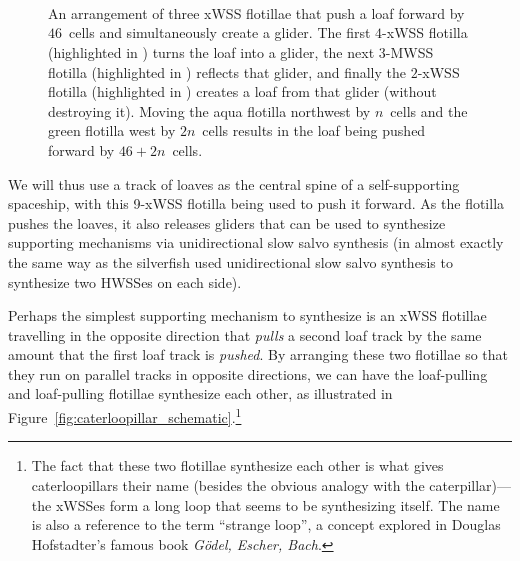 \begin{figure}[!htb]
	\centering
	 \\[1em]
	
	 \\[1em]
	
	 \\[1em]
	
	
	\caption{An arrangement of three xWSS flotillae that push a loaf forward by $46$~cells and simultaneously create a glider. The first $4$-xWSS flotilla (highlighted in ) turns the loaf into a glider, the next $3$-MWSS flotilla (highlighted in ) reflects that glider, and finally the $2$-xWSS flotilla (highlighted in ) creates a loaf from that glider (without destroying it). Moving the aqua flotilla northwest by $n$~cells and the green flotilla west by $2n$~cells results in the loaf being pushed forward by $46 + 2n$~cells.}\label{fig:caterloopillar_loaf_pusher}
\end{figure}

We will thus use a track of loaves as the central spine of a self-supporting spaceship, with this 9-xWSS flotilla being used to push it forward. As the flotilla pushes the loaves, it also releases gliders that can be used to synthesize supporting mechanisms via unidirectional slow salvo synthesis (in almost exactly the same way as the silverfish used unidirectional slow salvo synthesis to synthesize two HWSSes on each side).

Perhaps the simplest supporting mechanism to synthesize is an xWSS flotillae travelling in the opposite direction that \emph{pulls} a second loaf track by the same amount that the first loaf track is \emph{pushed}. By arranging these two flotillae so that they run on parallel tracks in opposite directions, we can have the loaf-pulling and loaf-pulling flotillae synthesize each other, as illustrated in Figure~\ref{fig:caterloopillar_schematic}.\footnote{The fact that these two flotillae synthesize each other is what gives caterloopillars their name (besides the obvious analogy with the caterpillar)---the xWSSes form a long loop that seems to be synthesizing itself. The name is also a reference to the term ``strange loop'', a concept explored in Douglas Hofstadter's famous book \emph{Gödel, Escher, Bach}.}

